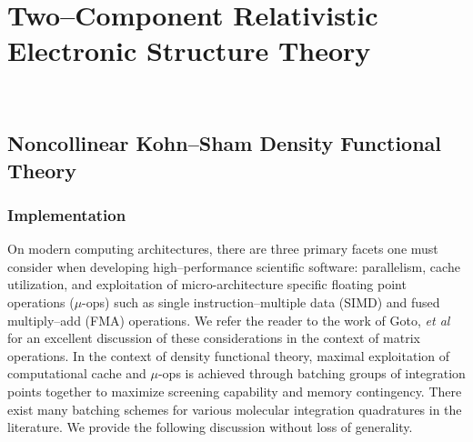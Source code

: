 \chapter{Two--Component Relativistic Electronic Structure Theory}
\

\section{Noncollinear Kohn--Sham Density Functional Theory}
\label{sec:NCDFT}

\subsection{Implementation}
\label{sec:NCDFT_IMPL}

On modern computing architectures, there are three primary facets one must consider when developing high--performance
scientific software: parallelism, cache utilization, and exploitation of micro-architecture specific floating point
operations ($\mu$-ops) such as single instruction--multiple data (SIMD) and fused multiply--add (FMA) operations. 
We refer the reader to the work of Goto, \emph{et al}\cite{Goto08_TOMS12} for an excellent discussion of these considerations in the context of matrix operations.
In the context of density functional theory, maximal exploitation of computational cache
and $\mu$-ops is achieved through batching groups of integration points together to maximize screening capability and
memory contingency. 
There exist many batching schemes for various molecular integration quadratures in the 
literature\cite{Becke88_2547,Jackson90_7453,Laming93_997,Johnson95_169,Frisch96_213,Reveles04_681,Sierka11_3097}.
We provide the following discussion without loss of generality.


